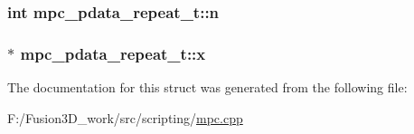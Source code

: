 \subsubsection[{n}]{\setlength{\rightskip}{0pt plus 5cm}int mpc\+\_\+pdata\+\_\+repeat\+\_\+t\+::n}\label{structmpc__pdata__repeat__t_a1129e6a02594f81135b82703983adcd7}
\hypertarget{structmpc__pdata__repeat__t_a6078512c08e14b36c0140794cde2b3cc}{}
\subsubsection[{x}]{$\ast$ mpc\+\_\+pdata\+\_\+repeat\+\_\+t\+::x}\label{structmpc__pdata__repeat__t_a6078512c08e14b36c0140794cde2b3cc}


The documentation for this struct was generated from the following file\+:\begin{DoxyCompactItemize}
\item 
F\+:/\+Fusion3\+D\+\_\+work/src/scripting/\hyperlink{mpc_8cpp}{mpc.\+cpp}\end{DoxyCompactItemize}
